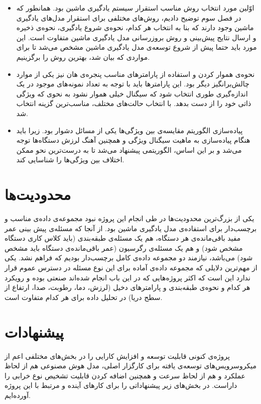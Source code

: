 \begin{itemize}

\item اوّلین مورد انتخاب روش مناسب استقرار سیستم یادگیری ماشین بود. همانطور که در فصل سوم توضیح دادیم، روش‌های مختلفی برای استقرار مدل‌های یادگیری ماشین وجود دارند که بنا به انتخاب هر کدام، نحوه‌ی شروع یادگیری، نحوه‌ی ذخیره‌ و ارسال نتایج پیش‌بینی و روش بروزرسانی مدل یادگیری ماشین متفاوت است. این مورد باید حتما پیش از شروع توسعه‌ی مدل یادگیری ماشین مشخص می‌شد تا برای مواردی که بیان شد، بهترین روش را برگزینیم.

\item نحوه‌ی هموار کردن و استفاده از پارامترهای مناسب پنجره‌ی هان نیز یکی از موارد چالش‌برانگیز دیگر بود. این پارامترها باید با توجه به تعداد نمونه‌های موجود در یک اندازه‌گیری طوری  انتخاب شود که سیگنال خیلی هموار نشود به نحوی که ویژگی ذاتی خود را از دست بدهد. با انتخاب حالت‌های مختلف، مناسب‌ترین گزینه انتخاب شد.

\item پیاده‌سازی الگوریتم مقایسه‌ی بین ویژگی‌ها یکی از مسائل دشوار بود. زیرا باید هنگام پیاده‌سازی به ماهیت سیگنال ویژگی  و همچنین آهنگ لرزش دستگا‌ه‌ها توجه می‌شد و بر این اساس، الگوریتمی پیشنهاد می‌شد تا به درست‌ترین نحو ممکن اختلاف بین ویژگی‌ها را شناسایی کند. 

\end{itemize}


\section{محدودیت‌ها}
یکی از بزرگ‌ترین محدودیت‌ها در طی انجام این پروژه نبود مجموعه‌ی داده‌‌ی مناسب و برچسب‌دار برای استفاده‌ی مدل یادگیری ماشین بود. از آنجا که مسئله‌ی پیش بینی عمر مفید باقی‌مانده‌ی هر دستگاه، هم یک مسئله‌ی طبقه‌بندی (باید کلاس کاری دستگاه مشخص شود) و هم یک مسئله‌ی رگرسیون (عمر باقی‌مانده‌ی دستگاه باید مشخص شود) می‌باشد، نیازمند دو مجموعه داده‌ی کامل برچسب‌دار بودیم که فراهم نشد. یکی از مهم‌ترین دلایلی که مجموعه داده‌ی آماده برای این نوع مسئله در دسترس عموم قرار ندارد این است که اکثر پروژه‌هایی که در این باب انجام شده‌اند صنعتی بوده و رویکرد هر کدام و نحوه‌ی طبقه‌بندی و پارامترهای دخیل (لرزش، دما، رطوبت، صدا، ارتفاع از سطح دریا) در تحلیل داده برای هر کدام متفاوت است.


\section{پیشنهادات}

پروژه‌ی کنونی قابلیت توسعه و افزایش کارایی را در بخش‌های مختلفی اعم از میکروسرویس‌های توسعه‌ی یافته برای کارگزار اصلی، مدل هوش مصنوعی هم از لحاظ عملکرد و هم از لحاظ سرعت و همچنین اضافه کردن قابلیت تشخیص نوع خرابی را داراست. در بخش‌های زیر پیشنهاداتی را برای کارهای آینده و مرتبط با این پروژه آورده‌ایم.

